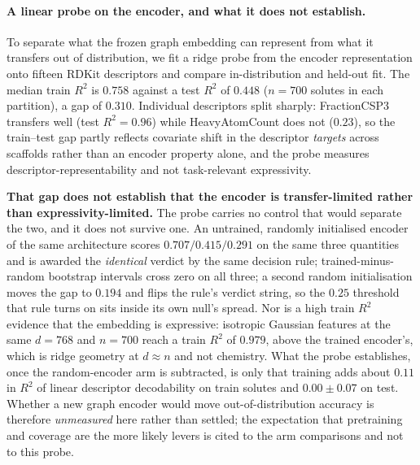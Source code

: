 \paragraph{A linear probe on the encoder, and what it does not establish.} To separate what the frozen graph embedding can represent from what it transfers out of distribution, we fit a ridge probe from the encoder representation onto fifteen RDKit descriptors and compare in-distribution and held-out fit. The median train $R^2$ is $0.758$ against a test $R^2$ of $0.448$ ($n=700$ solutes in each partition), a gap of $0.310$. Individual descriptors split sharply: FractionCSP3 transfers well (test $R^2 = 0.96$) while HeavyAtomCount does not ($0.23$), so the train--test gap partly reflects covariate shift in the descriptor \emph{targets} across scaffolds rather than an encoder property alone, and the probe measures descriptor-representability and not task-relevant expressivity.

\textbf{That gap does not establish that the encoder is transfer-limited rather than expressivity-limited.} The probe carries no control that would separate the two, and it does not survive one. An untrained, randomly initialised encoder of the same architecture scores $0.707/0.415/0.291$ on the same three quantities and is awarded the \emph{identical} verdict by the same decision rule; trained-minus-random bootstrap intervals cross zero on all three; a second random initialisation moves the gap to $0.194$ and flips the rule's verdict string, so the $0.25$ threshold that rule turns on sits inside its own null's spread. Nor is a high train $R^2$ evidence that the embedding is expressive: isotropic Gaussian features at the same $d=768$ and $n=700$ reach a train $R^2$ of $0.979$, above the trained encoder's, which is ridge geometry at $d\approx n$ and not chemistry. What the probe establishes, once the random-encoder arm is subtracted, is only that training adds about $0.11$ in $R^2$ of linear descriptor decodability on train solutes and $0.00\pm0.07$ on test. Whether a new graph encoder would move out-of-distribution accuracy is therefore \emph{unmeasured} here rather than settled; the expectation that pretraining and coverage are the more likely levers is cited to the arm comparisons and not to this probe.

